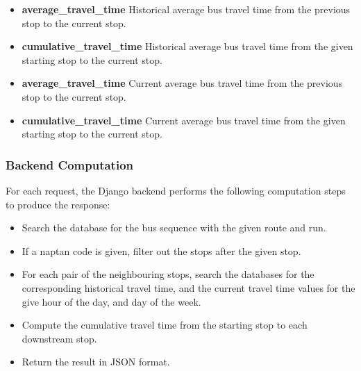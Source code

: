 \begin{itemize}
  \item \textbf{average\_travel\_time} Historical average bus travel time from the previous stop to the current stop.
  \item \textbf{cumulative\_travel\_time} Historical average bus travel time from the given starting stop to the current stop.
  \item \textbf{average\_travel\_time} Current average bus travel time from the previous stop to the current stop.
  \item \textbf{cumulative\_travel\_time} Current average bus travel time from the given starting stop to the current stop.
\end{itemize}

\subsubsection{Backend Computation}
For each request, the Django backend performs the following computation steps to produce the response:

\begin{itemize}
  \item Search the database for the bus sequence with the given route and run.
  \item If a \gls{naptan} code is given, filter out the stops after the given stop.
  \item For each pair of the neighbouring stops, search the databases for the corresponding historical travel time, and the current travel time values for the give hour of the day, and day of the week.
  \item Compute the cumulative travel time from the starting stop to each downstream stop.
  \item Return the result in JSON format.
\end{itemize}
